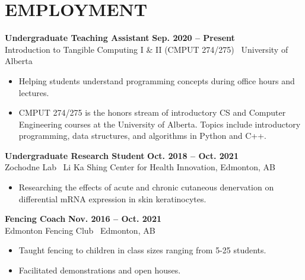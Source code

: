\documentclass{article}
\begin{document}
\section*{\textcolor{my_colour}{EMPLOYMENT}}
\vspace{-.25em} \hrulefill \vspace{.75em}

    \textbf{Undergraduate Teaching Assistant} \hfill \textbf{Sep. 2020 -- Present}\\
    Introduction to Tangible Computing I \& II (CMPUT 274/275) \textbar\ University of Alberta
    \begin{itemize}
        \item Helping students understand programming concepts during office hours and lectures.
        \item CMPUT 274/275 is the honors stream of introductory CS and Computer Engineering courses at the University of Alberta. Topics include introductory programming, data structures, and algorithms in Python and C++.
    \end{itemize}

    \textbf{Undergraduate Research Student} \hfill \textbf{Oct. 2018 -- Oct. 2021}\\
    Zochodne Lab \textbar\ Li Ka Shing Center for Health Innovation, Edmonton, AB
    \begin{itemize}
        \item Researching the effects of acute and chronic cutaneous denervation on differential mRNA expression in skin keratinocytes.
    \end{itemize}

    \textbf{Fencing Coach} \hfill \textbf{Nov. 2016 -- Oct. 2021}\\
    Edmonton Fencing Club \textbar\ Edmonton, AB
    \begin{itemize}
        \item Taught fencing to children in class sizes ranging from 5-25 students.
        \item Facilitated demonstrations and open houses.
    \end{itemize}


\end{document}
